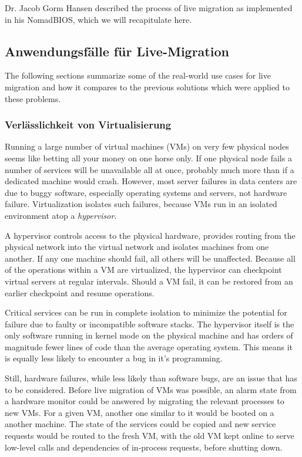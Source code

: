 \documentclass[draft,journal]{IEEEtran}
\begin{document}
Dr. Jacob Gorm Hansen described the process of live migration
as implemented in his NomadBIOS, which we will recapitulate here.

\subsection{Anwendungsfälle für Live-Migration}

The following sections summarize some of the real-world use cases for
live migration and how it compares to the previous solutions which
were applied to these problems.

\subsubsection{Verlässlichkeit von Virtualisierung}

Running a large number of virtual machines (VMs) on very few physical
nodes seems like betting all your money on one horse only. If one
physical node fails a number of services will be unavailable all at
once, probably much more than if a dedicated machine would
crash. However, most server failures in data centers are due to buggy
software, especially operating systems and servers, not hardware
failure. Virtualization isolates such failures, because VMs run in an
isolated environment atop a \emph{hypervisor}.

A hypervisor controls access to the physical hardware, provides
routing from the physical network into the virtual network and
isolates machines from one another. If any one machine should fail,
all others will be unaffected. Because all of the operations within a
VM are virtualized, the hypervisor can checkpoint virtual servers at
regular intervals. Should a VM fail, it can be restored from an
earlier checkpoint and resume operations.

Critical services can be run in complete isolation to minimize the
potential for failure due to faulty or incompatible software
stacks. The hypervisor itself is the only software running in kernel
mode on the physical machine and has orders of magnitude fewer lines
of code than the average operating system. This means it is equally
less likely to encounter a bug in it's programming.

Still, hardware failures, while less likely than software bugs, are an
issue that has to be considered. Before live migration of VMs was
possible, an alarm state from a hardware monitor could be answered by
migrating the relevant processes to new VMs\cite{hansen2004self}. For
a given VM, another one similar to it would be booted on a another
machine. The state of the services could be copied and new service
requests would be routed to the fresh VM, with the old VM kept online
to serve low-level calls and dependencies of in-process requests,
before shutting down\cite{clark2005live}.
\end{document}

